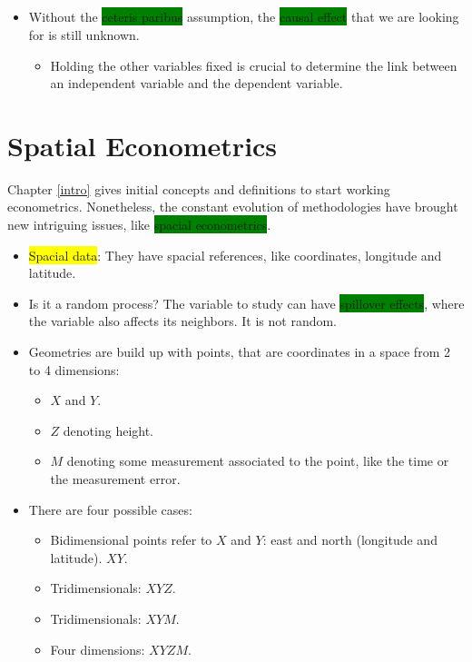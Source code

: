 \documentclass[
]{book}
\providecommand{\tightlist}{%
  \setlength{\itemsep}{0pt}\setlength{\parskip}{0pt}}
\newcommand{\defi}[1]{\colorbox{yellow}{#1}}
\newcommand{\key}[1]{\colorbox{green}{#1}}
\theoremstyle{definition}
\theoremstyle{definition}
\theoremstyle{definition}
\theoremstyle{definition}
\theoremstyle{remark}
\begin{document}
\section{}\label{section}

\begin{itemize}
\item
  Without the \key{ceteris paribus} assumption, the \key{causal effect} that we are looking for is still unknown.

  \begin{itemize}
  \tightlist
  \item
    Holding the other variables fixed is crucial to determine the link between an independent variable and the dependent variable.
  \end{itemize}
\end{itemize}

\chapter{Spatial Econometrics}\label{spatial}

Chapter \ref{intro} gives initial concepts and definitions to start working econometrics. Nonetheless, the constant evolution of methodologies have brought new intriguing issues, like \key{spacial econometrics}.

\begin{itemize}
\item
  \defi{Spacial data}: They have spacial references, like coordinates, longitude and latitude.
\item
  Is it a random process? The variable to study can have \key{spillover effects}, where the variable also affects its neighbors. It is not random.
\item
  Geometries are build up with points, that are coordinates in a space from 2 to 4 dimensions:

  \begin{itemize}
  \tightlist
  \item
    \(X\) and \(Y\).
  \item
    \(Z\) denoting height.
  \item
    \(M\) denoting some measurement associated to the point, like the time or the measurement error.
  \end{itemize}
\item
  There are four possible cases:

  \begin{itemize}
  \item
    Bidimensional points refer to \(X\) and \(Y\): east and north (longitude and latitude). \(XY\).
  \item
    Tridimensionals: \(XYZ\).
  \item
    Tridimensionals: \(XYM\).
  \item
    Four dimensions: \(XYZM\).
  \end{itemize}
\end{itemize}
\end{document}
